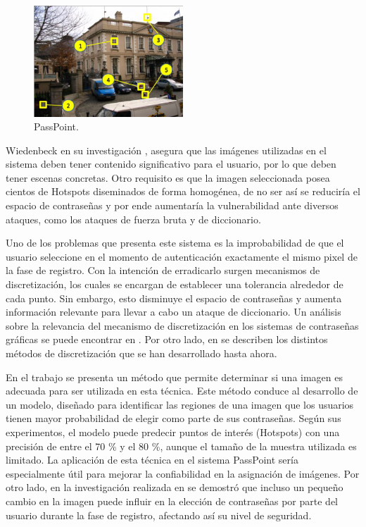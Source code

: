 \documentclass[12pt]{report}
\begin{document}
			\begin{figure}[ht]
		\centering
		\includegraphics[width=0.5\textwidth]{passpoint.png}
		\caption{PassPoint.}
		\label{fig:PassPoint}
	\end{figure}
	Wiedenbeck en su investigación \cite{1}, asegura que las imágenes utilizadas en el sistema deben tener contenido significativo para el usuario, por lo que deben tener escenas concretas. Otro requisito es que la imagen seleccionada posea cientos de Hotspots diseminados de forma homogénea, de no ser así se reduciría el espacio de contraseñas y por ende aumentaría la vulnerabilidad ante diversos ataques, como los ataques de fuerza bruta y de diccionario.
	 
	Uno de los problemas que presenta este sistema es la improbabilidad de que el usuario seleccione en el momento de autenticación exactamente el mismo pixel de la fase de registro. Con la intención de erradicarlo surgen mecanismos de discretización, los cuales se encargan de establecer una tolerancia alrededor de cada punto. Sin embargo, esto disminuye el espacio de contraseñas y aumenta información relevante para llevar a cabo un ataque de diccionario. Un análisis sobre la relevancia del mecanismo de discretización en los sistemas de contraseñas gráficas se puede encontrar en \cite{14,15,16}. Por otro lado, en \cite{14,15,16,17} se describen los distintos métodos de discretización que se han desarrollado hasta ahora.

	
	En el trabajo \cite{18} se presenta un método que permite determinar si una imagen es adecuada para ser utilizada en esta técnica. Este método conduce al desarrollo de un modelo, diseñado para identificar las regiones de una imagen que los usuarios tienen mayor probabilidad de elegir como parte de sus contraseñas. Según sus experimentos, el modelo puede predecir puntos de interés (Hotspots) con una precisión de entre el 70 \% y el 80 \%, aunque el tamaño de la muestra utilizada es limitado. La aplicación de esta técnica en el sistema PassPoint sería especialmente útil para mejorar la confiabilidad en la asignación de imágenes. Por otro lado, en la investigación realizada en \cite{19} se demostró que incluso un pequeño cambio en la imagen puede influir en la elección de contraseñas por parte del usuario durante la fase de registro, afectando así su nivel de seguridad.   
\end{document}
